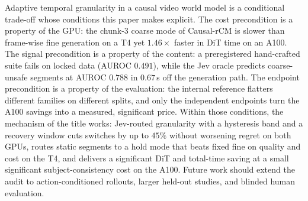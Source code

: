 \documentclass[journal]{IEEEtran}
\begin{document}
Adaptive temporal granularity in a causal video world model is a conditional trade-off whose conditions this paper makes explicit. The cost precondition is a property of the GPU: the chunk-3 coarse mode of Causal-rCM is slower than frame-wise fine generation on a T4 yet $1.46\times$ faster in DiT time on an A100. The signal precondition is a property of the content: a preregistered hand-crafted suite fails on locked data (AUROC $0.491$), while the Jev oracle predicts coarse-unsafe segments at AUROC $0.788$ in $0.67$\,s off the generation path. The endpoint precondition is a property of the evaluation: the internal reference flatters different families on different splits, and only the independent endpoints turn the A100 savings into a measured, significant price. Within those conditions, the mechanism of the title works: Jev-routed granularity with a hysteresis band and a recovery window cuts switches by up to $45\%$ without worsening regret on both GPUs, routes static segments to a hold mode that beats fixed fine on quality and cost on the T4, and delivers a significant DiT and total-time saving at a small significant subject-consistency cost on the A100. Future work should extend the audit to action-conditioned rollouts, larger held-out studies, and blinded human evaluation.



\end{document}
